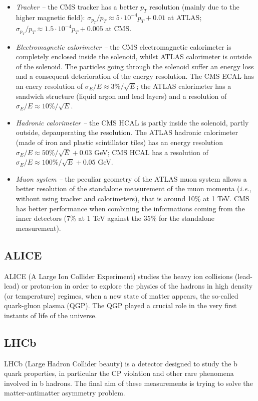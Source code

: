 \begin{itemize}
\item {\itshape Tracker --} the CMS tracker has a better $p_T$ resolution (mainly due to the higher magnetic field): $\sigma_{p_T}/p_T \approx 5 \cdot 10^{-4} p_T + 0.01$ at ATLAS; $\sigma_{p_T}/p_T \approx 1.5 \cdot 10^{-4} p_T + 0.005$ at CMS.
\item {\itshape Electromagnetic calorimeter --} the CMS electromagnetic calorimeter is completely enclosed inside the solenoid, whilst ATLAS calorimeter is outside of the solenoid. The particles going through the solenoid suffer an energy loss and a consequent deterioration of the energy resolution. The CMS ECAL has an enery resolution of $\sigma_E /E \approx 3\%/\sqrt{E}$; the ATLAS calorimeter has a sandwich structure (liquid argon and lead layers) and a resolution of $\sigma_E / E \approx 10\%/\sqrt{E}$.
\item {\itshape Hadronic calorimeter --} the CMS HCAL is partly inside the solenoid, partly outside, depauperating the resolution. The ATLAS hadronic calorimeter (made of iron and plastic scintillator tiles) has an energy resolution $\sigma_E /E \approx 50\%/\sqrt{E} + 0.03$ GeV; CMS HCAL has a resolution of $\sigma_E /E \approx 100\%/\sqrt{E} + 0.05$ GeV.
\item {\itshape Muon system --} the peculiar geometry of the ATLAS muon system allows a better resolution of the standalone measurement of the muon momenta (\textit{i.e.}, without using tracker and calorimeters), that is around 10\% at 1 TeV. CMS has better performance when combining the informations coming from the inner detectors (7\% at 1 TeV against the 35\% for the standalone measurement).
\end{itemize}

\subsection{ALICE}
ALICE (A Large Ion Collider Experiment) studies the heavy ion collisions (lead-lead) or proton-ion in order to explore the physics of the hadrons in high density (or temperature) regimes, when a new state of matter appears, the so-called quark-gluon plasma (QGP). The QGP played a crucial role in the very first instants of life of the universe.

\subsection{LHCb}
LHCb (Large Hadron Collider beauty) is a detector designed to study the b quark properties, in particular the CP violation and other rare phenomena involved in b hadrons. The final aim of these measurements is trying to solve the matter-antimatter asymmetry problem.

